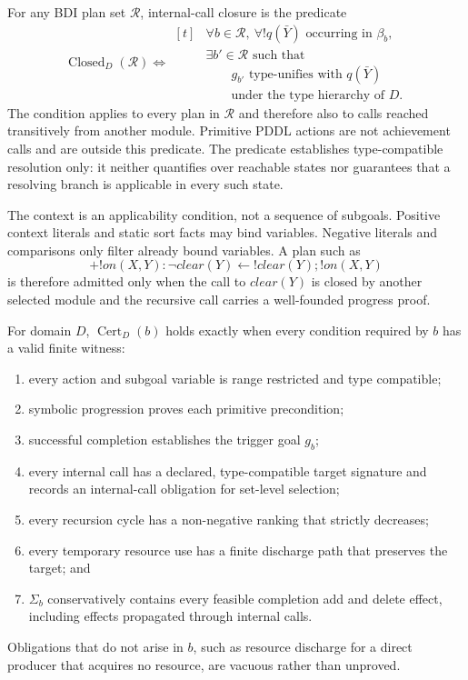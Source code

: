 \begin{definition}
For any BDI plan set $\mathcal R$, internal-call closure is the predicate
\[
\operatorname{Closed}_D(\mathcal R)
\Longleftrightarrow
\begin{aligned}[t]
&\forall b\in\mathcal R,\ \forall !q(\bar Y)\text{ occurring in }\beta_b,\\
&\exists b'\in\mathcal R\text{ such that}\\
&\qquad g_{b'}\text{ type-unifies with }q(\bar Y)\\
&\qquad\text{under the type hierarchy of }D.
\end{aligned}
\]
The condition applies to every plan in $\mathcal R$ and therefore also to calls
reached transitively from another module. Primitive PDDL actions are not
achievement calls and are outside this predicate. The predicate establishes
type-compatible resolution only: it neither quantifies over reachable states
nor guarantees that a resolving branch is applicable in every such state.
\end{definition}

The context is an applicability condition, not a sequence of subgoals. Positive
context literals and static sort facts may bind variables. Negative literals
and comparisons only filter already bound variables. A plan such as
\[
+!on(X,Y):\neg clear(Y)\leftarrow !clear(Y);!on(X,Y)
\]
is therefore admitted only when the call to $clear(Y)$ is closed by another
selected module and the recursive call carries a well-founded progress proof.

\begin{definition}[Certification]
For domain $D$, $\operatorname{Cert}_D(b)$ holds exactly when every condition
required by $b$ has a valid finite witness:
\begin{enumerate}
\item every action and subgoal variable is range restricted and type compatible;
\item symbolic progression proves each primitive precondition;
\item successful completion establishes the trigger goal $g_b$;
\item every internal call has a declared, type-compatible target signature and
records an internal-call obligation for set-level selection;
\item every recursion cycle has a non-negative ranking that strictly decreases;
\item every temporary resource use has a finite discharge path that preserves
the target; and
\item $\Sigma_b$ conservatively contains every feasible completion add and delete
effect, including effects propagated through internal calls.
\end{enumerate}
Obligations that do not arise in $b$, such as resource discharge for a direct
producer that acquires no resource, are vacuous rather than unproved.
\end{definition}

